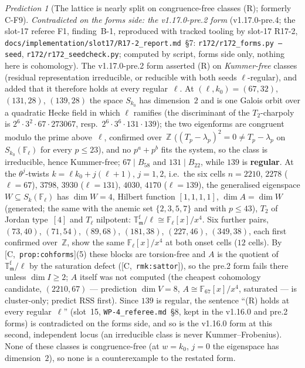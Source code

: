 \documentclass[11pt]{article}
\theoremstyle{remark}
\newtheorem{prediction}[theorem]{Prediction}
\newcommand{\F}{\mathbb{F}}
\newcommand{\Z}{\mathbb{Z}}
\newcommand{\Fl}{\F_\ell}
\newcommand{\T}{\mathbb{T}}
\newcommand{\m}{\mathfrak{m}}
\newcommand{\HA}[1]{[C,~\texttt{#1}]}      %
\begin{document}
\begin{prediction}[The lattice is nearly split on congruence-free classes (R); formerly C-F9]
\emph{Contradicted on the forms side: the v1.17.0-pre.2 form} (v1.17.0-pre.4; the slot-17 referee F1, finding~B-1, reproduced with tracked tooling by
slot-17 R17-2, \texttt{docs/implementation/slot17/R17-2\_report.md}~\S7: \texttt{r172/r172\_forms.py --seed}, \texttt{r172/r172\_seedcheck.py}; computed by
script, forms side only, nothing here is cohomology). The v1.17.0-pre.2 form asserted (R) on \emph{Kummer-free} classes (residual representation irreducible, or
reducible with both seeds $\ell$-regular), and added that it therefore holds at every regular~$\ell$. At $(\ell,k_0)=(67,32)$, $(131,28)$, $(139,28)$ the space
$S_{k_0}$ has dimension~$2$ and is one Galois orbit over a quadratic Hecke field in which $\ell$ ramifies (the discriminant of the $T_2$-charpoly is
$2^6\cdot3^2\cdot67\cdot273067$, resp.\ $2^6\cdot3^6\cdot131\cdot139$); the two eigenforms are congruent modulo the prime above~$\ell$, confirmed over~$\Z$
($(T_p-\lambda_p)^2=0\ne T_p-\lambda_p$ on $S_{k_0}(\Fl)$ for every $p\le23$), and no $p^a+p^b$ fits the system, so the class is irreducible, hence Kummer-free;
$67\mid B_{58}$ and $131\mid B_{22}$, while $139$ is \textbf{regular}. At the $\theta^j$-twists $k=\ell k_0+j(\ell+1)$, $j=1,2$, i.e.\ the six cells
$n=2210$, $2278$ ($\ell=67$), $3798$, $3930$ ($\ell=131$), $4030$, $4170$ ($\ell=139$), the generalised eigenspace $W\subseteq S_k(\Fl)$ has $\dim W=4$,
Hilbert function $[1,1,1,1]$, $\dim A=\dim W$ (generated; the same with the anemic set $\{2,3,5,7\}$ and with $p\le43$), $T_2$ of Jordan type~$[4]$ and
$T_\ell$ nilpotent: $\T^{\mathrm f}_\m/\ell\cong\Fl[x]/x^4$. Six further pairs, $(73,40)$, $(71,54)$, $(89,68)$, $(181,38)$, $(227,46)$, $(349,38)$, each
first confirmed over~$\Z$, show the same $\Fl[x]/x^4$ at both onset cells ($12$ cells). By \HA{prop:cohforms}(5) these blocks are torsion-free and $A$ is the
quotient of $\T^{\mathrm f}_\m/\ell$ by the saturation defect (\HA{rmk:sattor}), so the pre.2 form fails there unless $\dim I\ge2$; $A$ itself was not
computed (the cheapest cohomology candidate, $(2210,67)$ --- prediction $\dim V=8$, $A\cong\F_{67}[x]/x^4$, saturated --- is cluster-only; predict RSS first).
Since $139$ is regular, the sentence ``(R) holds at every regular~$\ell$'' (slot~15, \texttt{WP-4\_referee.md}~\S8, kept in the v1.16.0 and pre.2 forms) is
contradicted on the forms side, and so is the v1.16.0 form at this second, independent locus (an irreducible class is never Kummer--Frobenius). None of these
classes is congruence-free (at $w=k_0$, $j=0$ the eigenspace has dimension~$2$), so none is a counterexample to the restated form.


\end{prediction}
\end{document}
